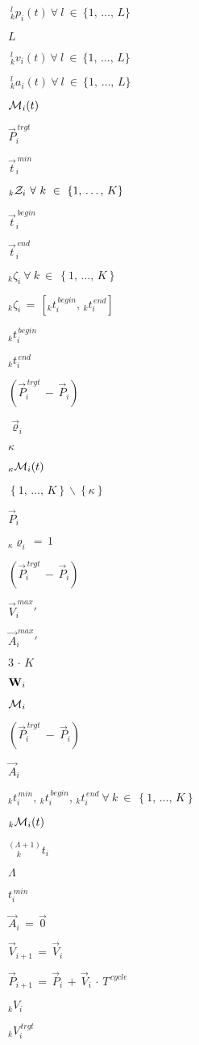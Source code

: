 \documentclass{article}
\begin{document}
$\ _{k}^{l}p_{i}(t)\ \forall\ l\ \in\ \{1,\,\dots,\,L\} $
\pagebreak

$ L $
\pagebreak

$\ _{k}^{l}v_{i}(t)\ \forall\ l\ \in\ \{1,\,\dots,\,L\} $
\pagebreak

$\ _{k}^{l}a_{i}(t)\ \forall\ l\ \in\ \{1,\,\dots,\,L\} $
\pagebreak

$ {\cal M}_{i}(t) $
\pagebreak

$ \vec{P}_i^{\,trgt} $
\pagebreak

$ \vec{t}_i^{\,min} $
\pagebreak

$ _k{\cal Z}_i\ \forall\ k\ \in\ \left\{1,\,\dots,\,K\right\} $
\pagebreak

$ \vec{t}_i^{\,begin} $
\pagebreak

$ \vec{t}_i^{\,end} $
\pagebreak

$ _k\zeta_{i}\ \forall\ k\ \in \ \left\{1,\,\dots,\,K\right\} $
\pagebreak

$ _k\zeta_{i}\,=\,\left[_kt_{i}^{\,begin},\,_kt_{i}^{\,end}\right] $
\pagebreak

$ _kt_{i}^{\,begin} $
\pagebreak

$ _kt_{i}^{\,end} $
\pagebreak

$ \left(\vec{P}_{i}^{\,trgt}\,-\,\vec{P}_{i}\right) $
\pagebreak

$ \vec{\varrho}_i $
\pagebreak

$ \kappa $
\pagebreak

$ _{\kappa}{\cal M}_{i}(t) $
\pagebreak

$ \left\{1,\,\dots,\,K\right\}\backslash\left\{\kappa\right\} $
\pagebreak

$ \vec{P}_i $
\pagebreak

$ _{\kappa}\varrho_i\,=\,1 $
\pagebreak

$ \left( \vec{P}_i^{\,trgt}\,-\,\vec{P}_i \right) $
\pagebreak

$ \left.\vec{V}_i^{\,max}\right.' $
\pagebreak

$ \left.\vec{A}_i^{\,max}\right.' $
\pagebreak

$ 3\,\cdot\,K $
\pagebreak

$ {\bf W}_i $
\pagebreak

$ {\cal M}_i $
\pagebreak

$ \left( \vec{P}_i^{\,trgt}\ -\ \vec{P}_i\right) $
\pagebreak

$ \vec{A}_i $
\pagebreak

$ _kt_i^{\,min},\,_kt_i^{\,begin},\,_kt_i^{\,end}\ \forall\ k\ \in\ \left\{1,\,\dots,\,K\right\} $
\pagebreak

$ _k{\cal M}_{i}(t) $
\pagebreak

$ ^{\left(\Lambda+1\right)}_{\ \ \ \ \ k}t_i $
\pagebreak

$ \Lambda $
\pagebreak

$ t_{i}^{\,min} $
\pagebreak

$ \vec{A}_{i}\,=\,\vec{0} $
\pagebreak

$ \vec{V}_{i+1}\,=\,\vec{V}_{i} $
\pagebreak

$ \vec{P}_{i+1}\,=\,\vec{P}_{i}\,+\,\vec{V}_{i}\,\cdot\,T^{\,cycle} $
\pagebreak

$ _kV_i $
\pagebreak

$ _kV_i^{\,trgt} $
\pagebreak
\end{document}
